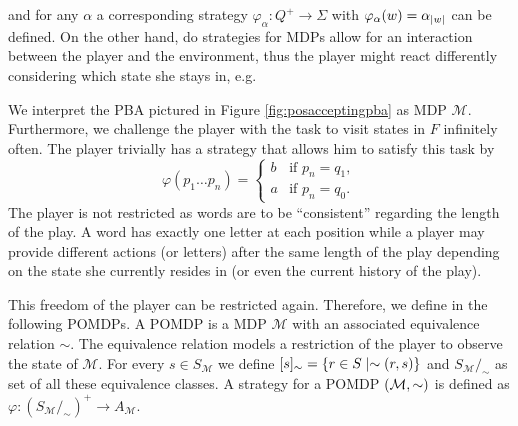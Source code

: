 and for any $\alpha$ a corresponding strategy 
$\varphi_{\alpha}:Q^{+}\rightarrow\Sigma$ with 
$\varphi_{\alpha}(w) = \alpha_{\left\vert{w}\right\vert}$ can be defined. On the other hand, do
strategies for \acp{MDP} allow for an interaction between the player and the
environment, thus the player might react differently considering which state
she stays in, e.g.
\begin{example}
  We interpret the \ac{PBA} pictured in Figure \ref{fig:posacceptingpba} as
  \ac{MDP} $\mathcal{M}$. Furthermore, we challenge the player with the task to
  visit states in $F$ infinitely often. The player trivially has a strategy 
  that allows him to satisfy this task by
  \begin{equation*}
    \varphi(p_{1}\dots p_{n}) = \begin{cases}
      b&\text{if }p_{n} = q_{1},\\
      a&\text{if }p_{n} = q_{0}.
    \end{cases}
  \end{equation*}
  The player is not restricted as words are to be \enquote{consistent} 
  regarding the length of the play. A word has exactly one letter at each 
  position while a player may provide different actions (or letters) after
  the same length of the play depending on the state she currently resides in
  (or even the current history of the play).
  \label{ex:pbaasmdp}
\end{example}
This freedom of the player can be restricted again. Therefore, we define in the
following \acp{POMDP}. A \ac{POMDP} is a \ac{MDP} $\mathcal{M}$ with an 
associated equivalence relation $\sim$. The equivalence relation models a 
restriction of the player to observe the state of $\mathcal{M}$. For every
$s\in S_{\mathcal{M}}$ we define
$[s]_{\sim} = \left\{r\in S\mid \sim(r,s)\right\}$ and
$S_{\mathcal{M}}/_{\sim}$ as set of all these equivalence classes. A
strategy for a \ac{POMDP} $\left(\mathcal{M}, \sim\right)$ is defined as
$\varphi:(S_{\mathcal{M}}/_{\sim})^{+}\rightarrow A_{\mathcal{M}}$.
